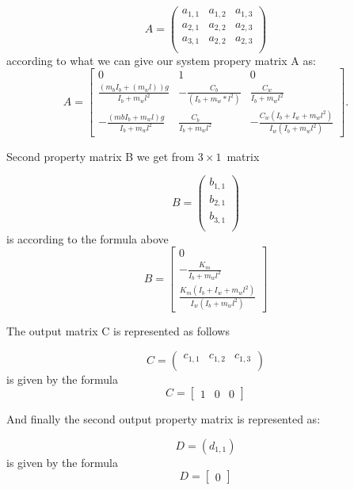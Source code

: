\[ A =  \left( \begin{array}{ccc}
a_{1,1} & a_{1,2} & a_{1,3} \\
a_{2,1} & a_{2,2} & a_{2,3} \\
a_{3,1} & a_{2,2} & a_{2,3} \\\end{array} \right)\] 
according to what we can give our system propery matrix A as:
\[ A =  \begin{bmatrix}
0 &  1 & 0 \\
\frac{(m_{b}I_{b}+(m_{w}l))g}{I_{b}+m_{w}l^2} & -\frac{C_{b}}{(I_{b}+m_{w}*l^2)} & \frac{C_{w}}{I_{b}+m_{w}l^2} \\
-\frac{(mbI_{b}+m_{w}l)g}{I_{b}+m_{w}l^2} & \frac{C_{b}}{I_{b}+m_{w}l^2} & -\frac{C_{w}(I_{b}+I_{w}+m_{w}l^2)}{I_{w}(I_{b}+m_{w}l^2)} \end{bmatrix} .\] 



Second property matrix B we get from
$3 \times 1$~matrix

\[ B =  \left( \begin{array}{ccc}
b_{1,1}  \\
b_{2,1}  \\
b_{3,1}  \\\end{array} \right)\] 
is according to the formula above\cite{state1}
\[ B = \begin{bmatrix}
        0  \\
-\frac{K_{m}}{I_{b}+m_{w}l^2}\\
\frac{K_{m}(I_{b}+I_{w}+m_{w}l^2)}{I_{w}(I_{b}+m_{w}l^2)}
       \end{bmatrix}\]



The output matrix C is represented as follows

\[ C =  \left( \begin{array}{ccc}
c_{1,1}  & c_{1,2}  & c_{1,3}  \\\end{array} \right)\] 
is given by the formula\cite{state1}
\[ C =\begin{bmatrix}
       1 & 0 & 0
      \end{bmatrix}
\] 

And finally the second output property matrix is represented as:


\[ D =  \left( 
d_{1,1}     \right)\] 
is given by the formula
\[ D= \begin{bmatrix}
    0
   \end{bmatrix}
\] 

